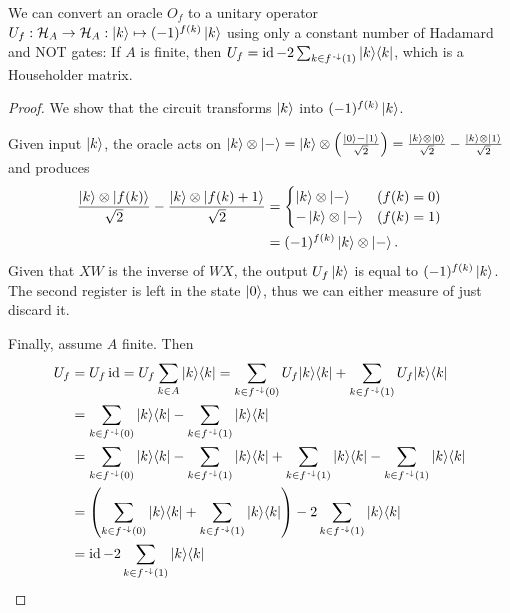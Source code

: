 \begin{lemma} \label{phaseUnitaryFromOracle}
We can convert an oracle $O_f$ to a unitary operator $U_f: \hilbert_A\to\hilbert_A: \ket{k}\mapsto (-1)^{f(k)}\ket{k}$ using only a constant number of Hadamard and NOT gates:
If $A$ is finite, then $U_f = \id - 2 \sum_{k\in f^{\preimf}(1)}\ketbra{k}{k}$, which is a Householder matrix.
\end{lemma}
\begin{proof}
We show that the circuit transforms $\ket{k}$ into $(-1)^{f(k)}\ket{k}$.

Given input $\ket{k}$, the oracle acts on $\ket{k}\otimes\ket{-} = \ket{k}\otimes\left(\frac{\ket{0}-\ket{1}}{\sqrt{2}}\right) = \frac{\ket{k}\otimes\ket{0}}{\sqrt{2}} - \frac{\ket{k}\otimes\ket{1}}{\sqrt{2}}$ and produces
\begin{align*}
\frac{\ket{k}\otimes\ket{f(k)}}{\sqrt{2}} - \frac{\ket{k}\otimes\ket{f(k)+1}}{\sqrt{2}} &= \begin{cases}
\ket{k}\otimes\ket{-} & (f(k) = 0) \\
-\ket{k}\otimes\ket{-} & (f(k) = 1) \\
\end{cases} \\
&= (-1)^{f(k)}\ket{k}\otimes\ket{-}.
\end{align*}
Given that $XW$ is the inverse of $WX$, the output $U_f\ket{k}$ is equal to $(-1)^{f(k)}\ket{k}$. The second register is left in the state $\ket{0}$, thus we can either measure of just discard it.

Finally, assume $A$ finite. Then
\begin{align*}
U_f &= U_f\id = U_f\sum_{k\in A}\ketbra{k}{k} = \sum_{k\in f^{\preimf}(0)}U_f\ketbra{k}{k} + \sum_{k\in f^{\preimf}(1)}U_f\ketbra{k}{k} \\
&= \sum_{k\in f^{\preimf}(0)}\ketbra{k}{k} - \sum_{k\in f^{\preimf}(1)}\ketbra{k}{k} \\
&= \sum_{k\in f^{\preimf}(0)}\ketbra{k}{k} - \sum_{k\in f^{\preimf}(1)}\ketbra{k}{k} + \sum_{k\in f^{\preimf}(1)}\ketbra{k}{k} - \sum_{k\in f^{\preimf}(1)}\ketbra{k}{k} \\
&= \left(\sum_{k\in f^{\preimf}(0)}\ketbra{k}{k} + \sum_{k\in f^{\preimf}(1)}\ketbra{k}{k}\right) - 2\sum_{k\in f^{\preimf}(1)}\ketbra{k}{k} \\
&= \id - 2\sum_{k\in f^{\preimf}(1)}\ketbra{k}{k}
\end{align*}
\end{proof}

